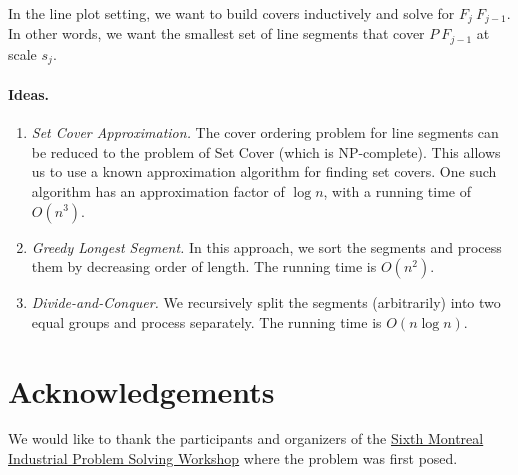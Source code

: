 \documentclass[11pt,a4paper]{article}
\begin{document}
In the line plot setting, we want to build covers inductively and solve for $F_j \ F_{j-1}$.
In other words, we want the smallest set of line segments that cover $P \ F_{j-1}$ at scale $s_j$.

\paragraph{Ideas.}
\begin{enumerate}
\item \emph{Set Cover Approximation.} 
  The cover ordering problem for line segments can be reduced to the problem of Set Cover (which is NP-complete).
  This allows us to use a known approximation algorithm for finding set covers. 
  One such algorithm has an approximation factor of $\log n$, with a running time of $O(n^3)$.
\item \emph{Greedy Longest Segment.}
  In this approach, we sort the segments and process them by decreasing order of length. 
  The running time is $O(n^2)$.
\item \emph{Divide-and-Conquer.} 
  We recursively split the segments (arbitrarily) into two equal groups and process separately. The running time is $O(n \log n)$.
\end{enumerate}


\vskip2cm

\section*{Acknowledgements}
We would like to thank the participants and organizers of the \href{http://www.crm.umontreal.ca/probindustriels2015/}{Sixth Montreal Industrial Problem Solving Workshop}
where the problem was first posed. 




\end{document}
